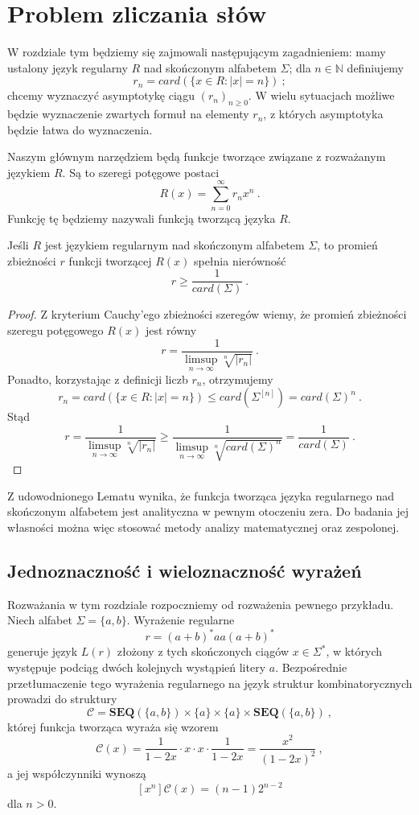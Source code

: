 \chapter{Problem zliczania słów}

W rozdziale tym będziemy się zajmowali następującym zagadnieniem: mamy ustalony język regularny $R$ nad skończonym alfabetem $\Sigma$; dla $n \in \mathbb{N}$ definiujemy 
$$r_n = card( \{x\in R: |x| = n\})~;$$ 
chcemy wyznaczyć asymptotykę ciągu $(r_n)_{n\geq 0}$. 
W wielu sytuacjach możliwe będzie wyznaczenie zwartych formuł na elementy $r_n$, z których asymptotyka będzie łatwa do wyznaczenia.  

Naszym głównym narzędziem będą funkcje tworzące związane z rozważanym językiem $R$. Są to szeregi potęgowe postaci 
$$R(x) = \sum_{n=0}^{\infty} r_n x^n~.$$
Funkcję tę będziemy nazywali funkcją tworzącą języka $R$.

\begin{lemma} Jeśli $R$ jest językiem regularnym nad skończonym alfabetem $\Sigma$, to promień zbieżności $r$ funkcji tworzącej $R(x)$ spełnia nierówność
$$ r \geq \frac{1}{card(\Sigma)}~.$$
\end{lemma}
\begin{proof}
    Z kryterium Cauchy'ego zbieżności szeregów  wiemy, że promień zbieżności szeregu potęgowego $R(x)$ jest równy
    $$r = \frac{1}{\limsup_{n \to \infty}{\sqrt[n]{|r_n|}}}~.$$
    Ponadto, korzystając z definicji liczb $r_n$, otrzymujemy
    $$r_n = card(\{x\in R : |x| = n\}) \leq card(\Sigma^{[n]}) = card(\Sigma)^n~.$$
    Stąd
    $$r = \frac{1}{\limsup_{n \to \infty}{\sqrt[n]{|r_n|}}} \geq \frac{1}{\limsup_{n \to \infty}{\sqrt[n]{card(\Sigma)^n}}} = \frac{1}{card(\Sigma)}~.$$
\end{proof}
Z udowodnionego Lematu wynika, że funkcja tworząca języka regularnego nad skończonym alfabetem jest analityczna w pewnym otoczeniu zera. Do badania jej własności można więc stosować metody analizy matematycznej oraz zespolonej.

\section{Jednoznaczność i wieloznaczność wyrażeń}

Rozważania w tym rozdziale rozpoczniemy od rozważenia pewnego przykładu.
Niech alfabet $\Sigma = \{a,b\}$. Wyrażenie regularne
\begin{equation} \label{eq:reg1}
r = (a+b)^* aa (a+b)^*
\end{equation}
generuje język $L(r)$ złożony z tych skończonych ciągów $x \in \Sigma^*$, w których występuje podciąg dwóch kolejnych wystąpień litery $a$. Bezpośrednie przetłumaczenie tego wyrażenia regularnego na język struktur kombinatorycznych prowadzi do struktury
$$
  \mathcal{C} = \mathbf{SEQ}(\{a,b\}) \times \{a\} \times \{a\} \times \mathbf{SEQ}(\{a,b\})~,
$$
której funkcja tworząca wyraża się wzorem
$$
  \mathcal{C}(x) = \frac{1}{1-2x} \cdot x \cdot x \cdot \frac{1}{1-2x} = \frac{x^2}{(1-2x)^2}~,
$$
a jej współczynniki wynoszą
$$
  [x^n]\mathcal{C}(x) = (n-1)2^{n-2}
$$
dla $n>0$. 

